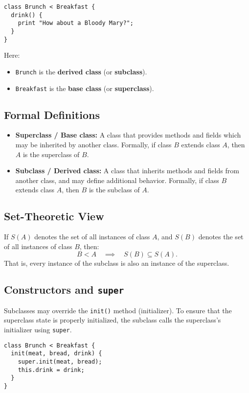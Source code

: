 \documentclass[12pt,a4paper]{article}
\begin{document}
\begin{lstlisting}
class Brunch < Breakfast {
  drink() {
    print "How about a Bloody Mary?";
  }
}
\end{lstlisting}

Here:
\begin{itemize}
	\item \texttt{Brunch} is the \textbf{derived class} (or \textbf{subclass}).
	\item \texttt{Breakfast} is the \textbf{base class} (or \textbf{superclass}).
\end{itemize}

\subsection*{Formal Definitions}
\begin{itemize}
	\item \textbf{Superclass / Base class:} A class that provides methods and fields which may be inherited by another class.
	      Formally, if class $B$ extends class $A$, then $A$ is the superclass of $B$.
	\item \textbf{Subclass / Derived class:} A class that inherits methods and fields from another class, and may define additional behavior.
	      Formally, if class $B$ extends class $A$, then $B$ is the subclass of $A$.
\end{itemize}

\subsection*{Set-Theoretic View}
If $S(A)$ denotes the set of all instances of class $A$, and $S(B)$ denotes the set of all instances of class $B$, then:
\[
	B < A \quad \implies \quad S(B) \subseteq S(A).
\]
That is, every instance of the subclass is also an instance of the superclass.

\subsection*{Constructors and \texttt{super}}
Subclasses may override the \texttt{init()} method (initializer). To ensure that
the superclass state is properly initialized, the subclass calls the
superclass’s initializer using \texttt{super}.

\begin{lstlisting}
class Brunch < Breakfast {
  init(meat, bread, drink) {
    super.init(meat, bread);
    this.drink = drink;
  }
}
\end{lstlisting}
\end{document}
